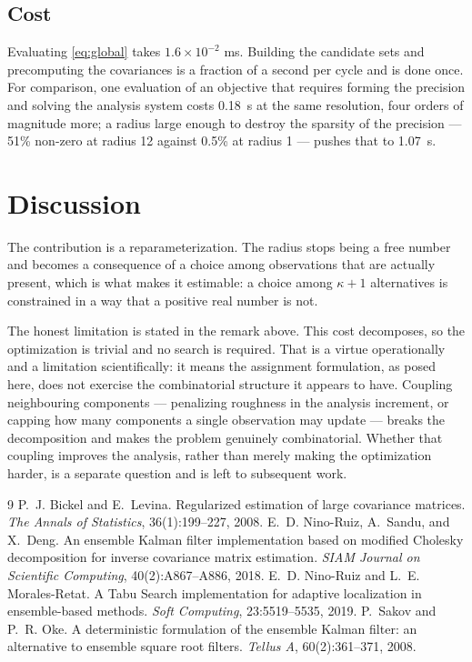 \documentclass[11pt,a4paper]{article}
\begin{document}
\subsection{Cost}

Evaluating \eqref{eq:global} takes $1.6\times10^{-2}$ ms. Building the
candidate sets and precomputing the covariances is a fraction of a second per
cycle and is done once. For comparison, one evaluation of an objective that
requires forming the precision and solving the analysis system costs 0.18~s at
the same resolution, four orders of magnitude more; a radius large enough to
destroy the sparsity of the precision --- 51\% non-zero at radius 12 against
0.5\% at radius 1 --- pushes that to 1.07~s.

\section{Discussion}

The contribution is a reparameterization. The radius stops being a free number
and becomes a consequence of a choice among observations that are actually
present, which is what makes it estimable: a choice among $\kappa+1$
alternatives is constrained in a way that a positive real number is not.

The honest limitation is stated in the remark above. This cost decomposes, so
the optimization is trivial and no search is required. That is a virtue
operationally and a limitation scientifically: it means the assignment
formulation, as posed here, does not exercise the combinatorial structure it
appears to have. Coupling neighbouring components --- penalizing roughness in
the analysis increment, or capping how many components a single observation may
update --- breaks the decomposition and makes the problem genuinely
combinatorial. Whether that coupling improves the analysis, rather than merely
making the optimization harder, is a separate question and is left to
subsequent work.

\begin{thebibliography}{9}
 P.~J. Bickel and E.~Levina.
  Regularized estimation of large covariance matrices.
  \emph{The Annals of Statistics}, 36(1):199--227, 2008.
 E.~D. Nino-Ruiz, A.~Sandu, and X.~Deng.
  An ensemble Kalman filter implementation based on modified Cholesky
  decomposition for inverse covariance matrix estimation.
  \emph{SIAM Journal on Scientific Computing}, 40(2):A867--A886, 2018.
 E.~D. Nino-Ruiz and L.~E. Morales-Retat.
  A Tabu Search implementation for adaptive localization in ensemble-based
  methods. \emph{Soft Computing}, 23:5519--5535, 2019.
 P.~Sakov and P.~R. Oke.
  A deterministic formulation of the ensemble Kalman filter: an alternative to
  ensemble square root filters. \emph{Tellus A}, 60(2):361--371, 2008.
\end{thebibliography}
\end{document}

